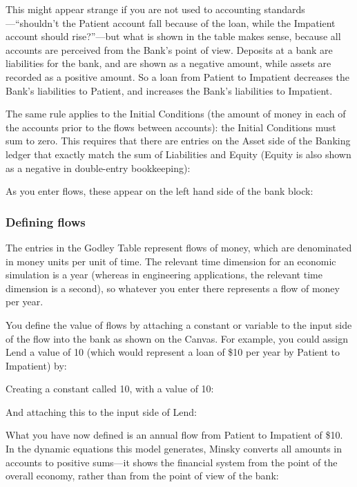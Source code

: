
This might appear strange if you are not used to accounting
standards---``shouldn't the Patient account fall because of the loan,
while the Impatient account should rise?''---but what is shown in the
table makes sense, because all accounts are perceived from the Bank's
point of view. Deposits at a bank are liabilities for the bank, and
are shown as a negative amount, while assets are recorded as a
positive amount. So a loan from Patient to Impatient decreases the
Bank's liabilities to Patient, and increases the Bank's liabilities to
Impatient. 

The same rule applies to the Initial Conditions (the amount of money
in each of the accounts prior to the flows between accounts): the
Initial Conditions must sum to zero. This requires that there are
entries on the Asset side of the Banking ledger that exactly match the
sum of Liabilities and Equity (Equity is also shown as a negative in
double-entry bookkeeping): 


As you enter flows, these appear on the left hand side of the bank block:


\subsubsection{Defining flows}

The entries in the Godley Table represent flows of money, which are
denominated in money units per unit of time. The relevant time
dimension for an economic simulation is a year (whereas in engineering
applications, the relevant time dimension is a second), so whatever
you enter there represents a flow of money per year.


You define the value of flows by attaching a constant or variable to
the input side of the flow into the bank as shown on the Canvas. For
example, you could assign Lend a value of 10 (which would represent a
loan of \$10 per year by Patient to Impatient) by:



Creating a constant called 10, with a value of 10:


And attaching this to the input side of Lend:



What you have now defined is an annual flow from Patient to Impatient
of \$10. In the dynamic equations this model generates, Minsky
converts all amounts in accounts to positive sums---it shows the
financial system from the point of the overall economy, rather than
from the point of view of the bank:

